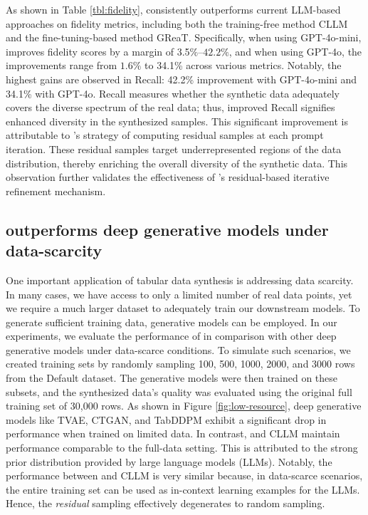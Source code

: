 As shown in Table \ref{tbl:fidelity}, \modelname consistently outperforms current LLM-based approaches on fidelity metrics, including both the training-free method CLLM and the fine-tuning-based method GReaT. Specifically, when using GPT-4o-mini, \modelname improves fidelity scores by a margin of 3.5$\%–42.2\%$, and when using GPT-4o, the improvements range from $1.6\%$ to 34.1\% across various metrics. Notably, the highest gains are observed in Recall: 42.2\% improvement with GPT-4o-mini and 34.1\% with GPT-4o.
Recall measures whether the synthetic data adequately covers the diverse spectrum of the real data; thus, improved Recall signifies enhanced diversity in the synthesized samples. This significant improvement is attributable to \modelname’s strategy of computing residual samples at each prompt iteration. These residual samples target underrepresented regions of the data distribution, thereby enriching the overall diversity of the synthetic data. This observation further validates the effectiveness of \modelname’s residual-based iterative refinement mechanism.

\subsection{\modelname outperforms deep generative models under data-scarcity}

One important application of tabular data synthesis is addressing data scarcity. In many cases, we have access to only a limited number of real data points, yet we require a much larger dataset to adequately train our downstream models. To generate sufficient training data, generative models can be employed.
In our experiments, we evaluate the performance of \modelname in comparison with other deep generative models under data-scarce conditions. To simulate such scenarios, we created training sets by randomly sampling 100, 500, 1000, 2000, and 3000 rows from the Default dataset. The generative models were then trained on these subsets, and the synthesized data’s quality was evaluated using the original full training set of 30,000 rows.
As shown in Figure \ref{fig:low-resource}, deep generative models like TVAE, CTGAN, and TabDDPM exhibit a significant drop in performance when trained on limited data. In contrast, \modelname and CLLM maintain performance comparable to the full-data setting. This is attributed to the strong prior distribution provided by large language models (LLMs). Notably, the performance between \modelname and CLLM is very similar because, in data-scarce scenarios, the entire training set can be used as in-context learning examples for the LLMs. Hence, the \textit{residual} sampling effectively degenerates to random sampling.

